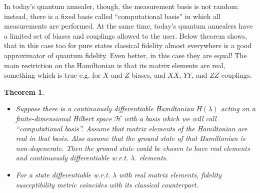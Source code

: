 \documentclass[american,aps,pra,reprint,floatfix,nofootinbib,superscriptaddress]{revtex4-2}
\newtheorem{theorem}{Theorem}
\begin{document}
In today's quantum annealer, though, the measurement basis is not random:
instead, there is a fixed basis called ``computational basis'' in which
all measurements are performed. At the same time, today's quantum annealers
have a limited set of biases and couplings allowed to the user. Below theorem
shows, that in this case too for pure states classical fidelity almost
everywhere is a good approximator of quantum fidelity. Even better, in this
case they are equal!
The main restriction on the Hamiltonian is that its matrix elements are
real, something which is true e.g. for $X$ and $Z$ biases,
and $XX$, $YY$, and $ZZ$ couplings.
\begin{theorem}
  \label{th:comput.basis}
  \begin{itemize}
    \item Suppose there is a continuously differentiable
      Hamiltonian $H(\lambda)$ acting on a
      finite-dimensional Hilbert space $\mathcal{H}$ with a basis which we
      will call ``computational basis''. Assume that matrix elements of the
      Hamiltonian are real in that basis. Also assume that the ground state of
      that Hamiltonian is non-degenerate.
      Then the ground state could be chosen to have real elements and
      continuously differentiable w.r.t. $\lambda$.
      elements.
    \item For a state differentiable w.r.t. $\lambda$ with real matrix elements,
      fidelity susceptibility metric coincides with its classical counterpart.
  \end{itemize}
\end{theorem}
\end{document}
